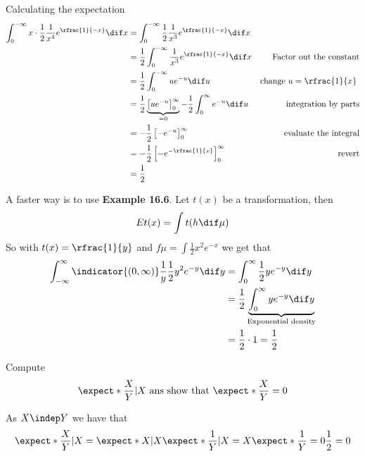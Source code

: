 \begin{solution}
Calculating the expectation
\begin{align*}
    	\int_0^{-\infty}x\cdot\frac{1}{2}\frac{1}{x^4}e^{\rfrac{1}{-x}}\dif x & =\int_0^{-\infty}\frac{1}{2}\frac{1}{x^3}e^{\rfrac{1}{-x}}\dif x & \\
    	& = \frac{1}{2}\int_0^{-\infty}\frac{1}{x^3}e^{\rfrac{1}{-x}} \dif x& \text{Factor out the constant} \\
    	&= \frac{1}{2}\int_0^{-\infty}ue^{-u} \dif u& \text{change \(u=\rfrac{1}{x}\) } \\
    	& = \frac{1}{2}\underbrace{\left[ue^{-u}\right]_0^\infty}_{=0}-\frac{1}{2}\int_0^\infty e^{-u} \dif u & \text{integration by parts} \\
    	& =-\frac{1}{2}\left[-e^{-u}\right]_0^\infty & \text{evaluate the integral} \\
    	& =-\frac{1}{2}\left[-e^{-\rfrac{1}{x}}\right]_0^\infty & \text{revert} \\
    	& = \frac{1}{2}
\end{align*}
\begin{framed}
A faster way is to use \textbf{Example 16.6}. Let \(t(x)\) be a transformation, then
\[
	Et(x)=\int t(h\dif \mu)
\]
So with \(t(x)=\rfrac{1}{y}\) and \(f\mu=\int \frac{1}{2}x^2e^{-x}\)  we get that
\begin{align}
	\int_{-\infty}^\infty\indicator{(0,\infty)}\frac{1}{y}\frac{1}{2}y^2e^{-y}\dif y  & = \int_{0}^\infty\frac{1}{2}ye^{-y}\dif y \\
	& = \frac{1}{2} \underbrace{\int_{0}^\infty ye^{-y}\dif y}_{\text{Exponential density}} \\
	& = \frac{1}{2}\cdot 1=\frac{1}{2}
\end{align}

\end{framed}
\begin{problem}
Compute
\[
	\expect*{\frac{X}{Y}| X} \text{ ans show that } \expect*{\frac{X}{Y}}=0
\]
\end{problem}
\begin{solution}
As \(X\indep Y\) we have that
\[
	\expect*{\frac{X}{Y}| X}=\expect*{ X| X}\expect*{\frac{1}{Y}| X}=X\expect*{\frac{1}{Y}}=0\frac{1}{2}=0
\]

\end{solution}
\end{solution}
